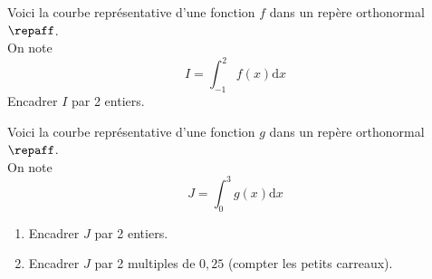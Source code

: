 \documentclass[a4paper,11pt,exos]{nsi} %
\begin{document}
\begin{minipage}{10cm}
	\exo{}
	Voici la courbe représentative d'une fonction $f$ dans un repère orthonormal $\repaff$.\\
	On note $$\displaystyle I=\int_{-1}^{2}f(x)\text{d}x$$
	Encadrer $I$ par 2 entiers.
	
\end{minipage}\hspace*{.5cm}
\begin{minipage}{6.5cm}
			\def\xmin{-2}	\def\xmax{4}	\def\ymin{-1}	\def\ymax{5}
			\def\F{-(\x+1)*(\x-3)}
		\end{minipage}
		
\vspace*{.5cm}
	
	
\begin{minipage}{6.5cm}
	\def\xmin{-2}\def\xmax{4}\def\ymin{-1}\def\ymax{6}
	\def\F{5+(\x+1)*(\x-3)}
\end{minipage}
\begin{minipage}{10cm}
	\exo{}
	Voici la courbe représentative d'une fonction $g$ dans un repère orthonormal $\repaff$.\\
On note $$\displaystyle J=\int_{0}^{3}g(x)\text{d}x$$
\begin{enumerate}
	\item 	Encadrer $J$ par 2 entiers.
	\item 	Encadrer $J$ par 2 multiples de $0,25$ (compter les petits carreaux).
\end{enumerate}
\end{minipage}

\vspace*{1cm}
\end{document}
